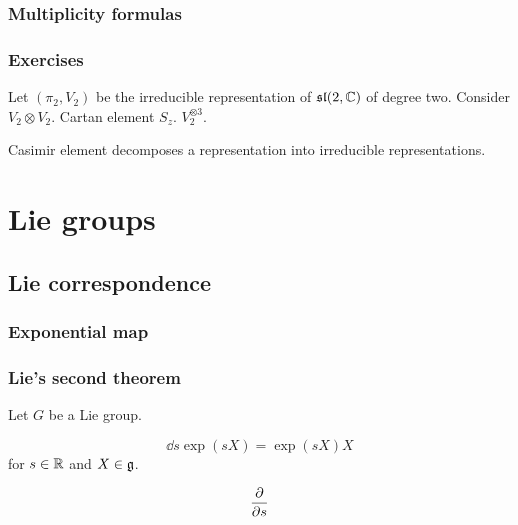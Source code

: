 \documentclass{../../large}
\begin{document}
\section{Multiplicity formulas}

\section*{Exercises}
\begin{prb}
Let $(\pi_2,V_2)$ be the irreducible representation of $\mathfrak{sl}(2,\mathbb{C})$ of degree two.
Consider $V_2\otimes V_2$.
Cartan element $S_z$.
$V_2^{\otimes3}$.
\end{prb}
\begin{prb}
Casimir element decomposes a representation into irreducible representations.
\end{prb}








\part{Lie groups}
\chapter{Lie correspondence}
\section{Exponential map}
\begin{prb}
\end{prb}
\begin{prb}
\end{prb}

\begin{prb}
\end{prb}


\section{Lie's second theorem}
\begin{prb}
Let $G$ be a Lie group.
\begin{parts}
\item
\[\dd{s}\exp(sX)=\exp(sX)X\]
for $s\in\mathbb{R}$ and $X\in\mathfrak{g}$.
\item
\[\pd{s}\]
\end{parts}
\end{prb}
\end{document}
